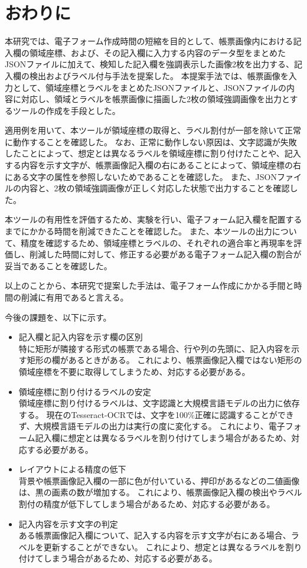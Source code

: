 \chapter{おわりに}\label{cha:Conclusion}
本研究では、電子フォーム作成時間の短縮を目的として、帳票画像内における記入欄の領域座標、および、その記入欄に入力する内容のデータ型をまとめたJSONファイルに加えて、検知した記入欄を強調表示した画像2枚を出力する、記入欄の検出およびラベル付与手法を提案した。
本提案手法では、帳票画像を入力として、領域座標とラベルをまとめたJSONファイルと、JSONファイルの内容に対応し、領域とラベルを帳票画像に描画した2枚の領域強調画像を出力とするツールの作成を手段とした。

適用例を用いて、本ツールが領域座標の取得と、ラベル割付が一部を除いて正常に動作することを確認した。
なお、正常に動作しない原因は、文字認識が失敗したことによって、想定とは異なるラベルを領域座標に割り付けたことや、記入する内容を示す文字が、帳票画像記入欄の右にあることによって、領域座標の右にある文字の属性を参照しないためであることを確認した。
また、JSONファイルの内容と、2枚の領域強調画像が正しく対応した状態で出力することを確認した。

本ツールの有用性を評価するため、実験を行い、電子フォーム記入欄を配置するまでにかかる時間を削減できたことを確認した。
また、本ツールの出力について、精度を確認するため、領域座標とラベルの、それぞれの適合率と再現率を評価し、削減した時間に対して、修正する必要がある電子フォーム記入欄の割合が妥当であることを確認した。

以上のことから、本研究で提案した手法は、電子フォーム作成にかかる手間と時間の削減に有用であると言える。

今後の課題を、以下に示す。

\begin{itemize}
    \item 記入欄と記入内容を示す欄の区別\\
        特に矩形が隣接する形式の帳票である場合、行や列の先頭に、記入内容を示す矩形の欄があるときがある。
        これにより、帳票画像記入欄ではない矩形の領域座標を不要に取得してしまうため、対応する必要がある。
    \item 領域座標に割り付けるラベルの安定\\
        領域座標に割り付けるラベルは、文字認識と大規模言語モデルの出力に依存する。
        現在のTesseract-OCRでは、文字を100\%正確に認識することができず、大規模言語モデルの出力は実行の度に変化する。
        これにより、電子フォーム記入欄に想定とは異なるラベルを割り付けてしまう場合があるため、対応する必要がある。
    \item レイアウトによる精度の低下\\
        背景や帳票画像記入欄の一部に色が付いている、押印があるなどの二値画像は、黒の画素の数が増加する。
        これにより、帳票画像記入欄の検出やラベル割付の精度が低下してしまう場合があるため、対応する必要がある。
    \item 記入内容を示す文字の判定\\
        ある帳票画像記入欄について、記入する内容を示す文字が右にある場合、ラベルを更新することができない。
        これにより、想定とは異なるラベルを割り付けてしまう場合があるため、対応する必要がある。
\end{itemize}